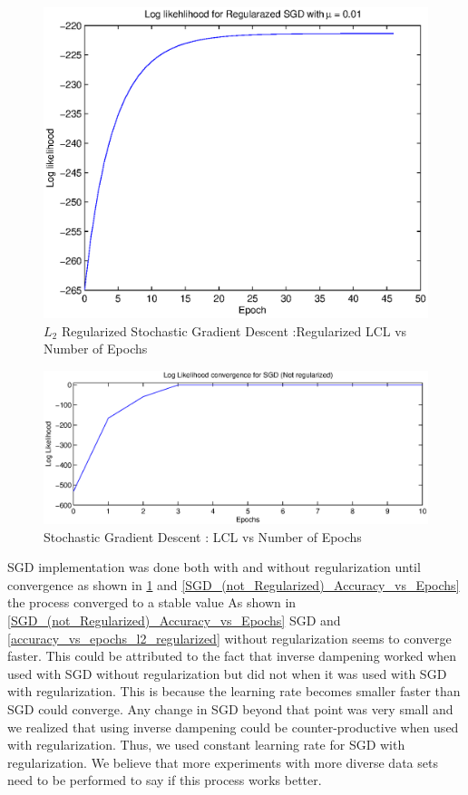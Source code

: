 \documentclass{acm_proc_article-sp}
\begin{document}
\begin{figure}\label{SGD_Regularized_Log_Likelihood}
\centering
\includegraphics[scale=0.5]{Regularized_Log_Likelihood.eps}
\caption{$L_{2}$ Regularized Stochastic Gradient Descent :Regularized LCL vs Number of Epochs}
\end{figure}

\begin{figure}
\centering
\includegraphics[scale=0.4]{Log_likelihood_for_SGD_(Not_Regularized).eps}
\caption{Stochastic Gradient Descent : LCL vs Number of Epochs}
\end{figure}

SGD implementation was done both with and without regularization until convergence as shown in \ref{SGD_Regularized_Log_Likelihood} and \ref{SGD_(not_Regularized)_Accuracy_vs_Epochs} the process converged to a stable value As shown in \ref{SGD_(not_Regularized)_Accuracy_vs_Epochs} SGD and \ref{accuracy_vs_epochs_l2_regularized} without regularization seems to converge faster. This could be attributed to the fact that inverse dampening worked when used with SGD without regularization but did not when it was used with SGD with regularization. This is because the learning rate becomes smaller faster than SGD could converge. Any change in SGD beyond that point was very small and we realized that using inverse dampening could be counter-productive when used with regularization. Thus, we used constant learning rate for SGD with regularization. We believe that more experiments with more diverse data sets need to be performed to say if this process works better.
\end{document}
